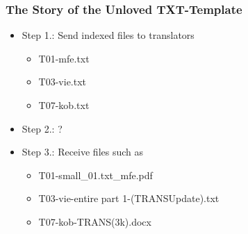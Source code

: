 \documentclass[aspectratio=169]{beamer}
\begin{document}
\begin{frame}[fragile]
	\frametitle{The Story of the Unloved TXT-Template}
    \centering
    \large
    \begin{itemize}
        \item Step 1.: Send indexed files to translators
        \begin{itemize}
            \item T01-mfe.txt
            \item T03-vie.txt
            \item T07-kob.txt
        \end{itemize}
        \item Step 2.: ?
        \item Step 3.: Receive files such as
        \begin{itemize}
            \item T01-small\_01.txt\_mfe.pdf
            \item T03-vie-entire part 1-(TRANSUpdate).txt
            \item T07-kob-TRANS(3k).docx
        \end{itemize}
    \end{itemize}
\end{frame}
\end{document}
